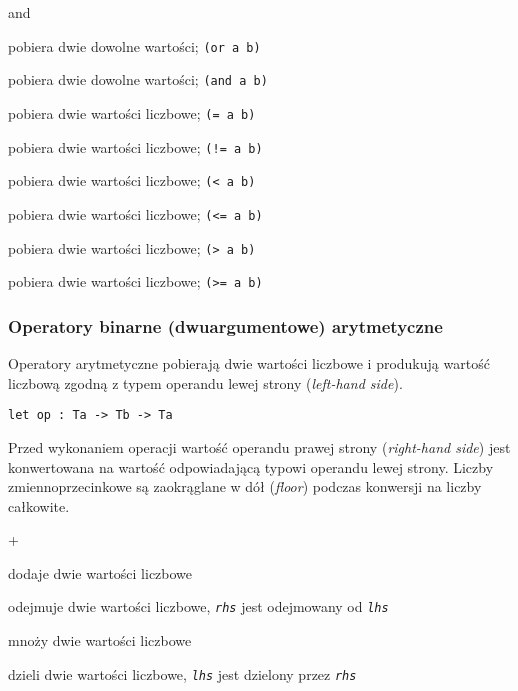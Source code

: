 \begin{labeling}{and}
    \item[\texttt{or}] pobiera dwie dowolne wartości; \texttt{(or a b)}
    \item[\texttt{and}] pobiera dwie dowolne wartości; \texttt{(and a b)}
    \item[\texttt{=}] pobiera dwie wartości liczbowe; \texttt{(= a b)}
    \item[\texttt{!=}] pobiera dwie wartości liczbowe; \texttt{(!= a b)}
    \item[\texttt{<}] pobiera dwie wartości liczbowe; \texttt{(< a b)}
    \item[\texttt{<=}] pobiera dwie wartości liczbowe; \texttt{(<= a b)}
    \item[\texttt{>}] pobiera dwie wartości liczbowe; \texttt{(> a b)}
    \item[\texttt{>=}] pobiera dwie wartości liczbowe; \texttt{(>= a b)}
\end{labeling}

\subsubsection{Operatory binarne (dwuargumentowe) arytmetyczne}

Operatory arytmetyczne pobierają dwie wartości liczbowe i produkują wartość
liczbową zgodną z typem operandu lewej strony (\emph{left-hand side}).

\begin{lstlisting}
let op : Ta -> Tb -> Ta
\end{lstlisting}

Przed wykonaniem operacji wartość operandu prawej strony (\emph{right-hand side})
jest konwertowana na wartość odpowiadającą typowi operandu lewej strony. Liczby
zmiennoprzecinkowe są zaokrąglane w dół (\emph{floor}) podczas konwersji na
liczby całkowite.

\begin{labeling}{+}
    \item[\texttt{+}] dodaje dwie wartości liczbowe
    \item[\texttt{-}] odejmuje dwie wartości liczbowe, \emph{\texttt{rhs}} jest odejmowany od
        \emph{\texttt{lhs}}
    \item[\texttt{*}] mnoży dwie wartości liczbowe
    \item[\texttt{/}] dzieli dwie wartości liczbowe, \emph{\texttt{lhs}} jest dzielony przez
        \emph{\texttt{rhs}}
\end{labeling}

